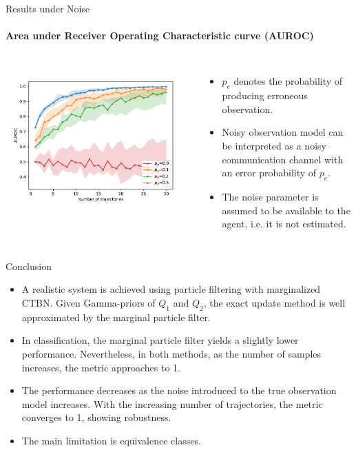 \documentclass[
english,%
aspectratio=169,%
color={accentcolor=3b},
logo=true,%
colorframetitle=false,%
]{tudabeamer}
\begin{document}
\begin{frame}{Results under Noise}
\framesubtitle{Area under Receiver Operating Characteristic curve (AUROC)}
\begin{columns}[onlytextwidth,c]
\centering
\includegraphics[width=\linewidth]{figures/error_AUROC_perc_0}
\begin{itemize}
\item $ p_e $ denotes the probability of producing erroneous observation.
\item Noisy observation model can be interpreted as a noisy communication channel with an error probability of $ p_e $.
\item The noise parameter is assumed to be available to the agent, i.e. it is not estimated.
\end{itemize}
\end{columns}
\end{frame}


\begin{frame}{Conclusion}
\begin{itemize}
\item A realistic system is achieved using particle filtering with marginalized CTBN. Given Gamma-priors of $ Q_1 $ and $ Q_2 $, the exact update method is well approximated by the marginal particle filter.
\item In classification, the marginal particle filter yields a slightly lower performance. Nevertheless, in both methods, as the number of samples increases, the metric approaches to 1.
\item The performance decreases as the noise introduced to the true observation model increases. With the increasing number of trajectories, the metric converges to 1, showing robustness.
\item The main limitation is equivalence classes.
\end{itemize}
\end{frame}
\end{document}
